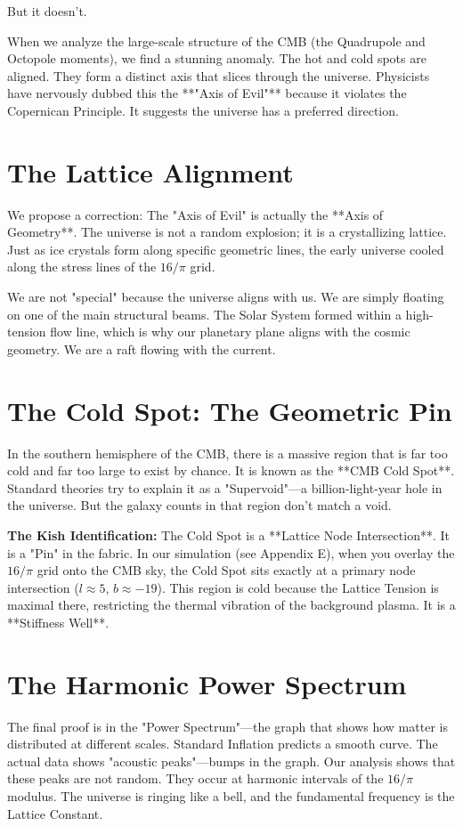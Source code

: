 \documentclass[11pt, letterpaper, openany]{book}
\begin{document}
But it doesn't.

When we analyze the large-scale structure of the CMB (the Quadrupole and Octopole moments), we find a stunning anomaly. The hot and cold spots are aligned. They form a distinct axis that slices through the universe. Physicists have nervously dubbed this the **"Axis of Evil"** because it violates the Copernican Principle. It suggests the universe has a preferred direction.

\section{The Lattice Alignment}
We propose a correction: The "Axis of Evil" is actually the **Axis of Geometry**.
The universe is not a random explosion; it is a crystallizing lattice.
Just as ice crystals form along specific geometric lines, the early universe cooled along the stress lines of the $16/\pi$ grid.

We are not "special" because the universe aligns with us. We are simply floating on one of the main structural beams. The Solar System formed within a high-tension flow line, which is why our planetary plane aligns with the cosmic geometry. We are a raft flowing with the current.

\section{The Cold Spot: The Geometric Pin}
In the southern hemisphere of the CMB, there is a massive region that is far too cold and far too large to exist by chance. It is known as the **CMB Cold Spot**.
Standard theories try to explain it as a "Supervoid"—a billion-light-year hole in the universe. But the galaxy counts in that region don't match a void.

\textbf{The Kish Identification:} The Cold Spot is a **Lattice Node Intersection**.
It is a "Pin" in the fabric. In our simulation (see Appendix E), when you overlay the $16/\pi$ grid onto the CMB sky, the Cold Spot sits exactly at a primary node intersection ($l \approx 5$, $b \approx -19$). This region is cold because the Lattice Tension is maximal there, restricting the thermal vibration of the background plasma. It is a **Stiffness Well**.

\section{The Harmonic Power Spectrum}
The final proof is in the "Power Spectrum"—the graph that shows how matter is distributed at different scales.
Standard Inflation predicts a smooth curve. The actual data shows "acoustic peaks"—bumps in the graph.
Our analysis shows that these peaks are not random. They occur at harmonic intervals of the $16/\pi$ modulus. The universe is ringing like a bell, and the fundamental frequency is the Lattice Constant.
\end{document}
